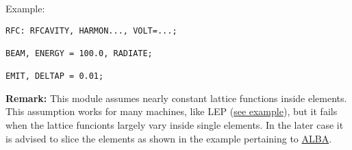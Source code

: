 Example: 
\begin{verbatim}
RFC: RFCAVITY, HARMON..., VOLT=...;
     
BEAM, ENERGY = 100.0, RADIATE;
     
EMIT, DELTAP = 0.01;
\end{verbatim}

{\bf Remark:}  This module assumes nearly constant lattice functions
inside elements. This assumption works for many machines, like LEP
(\href{http://cern.ch/frs/mad-X_examples/emit/LEP/}{see example}), but
it fails when the lattice funcionts largely vary inside single
elements. In the later case it is advised to slice the elements as shown
in the example pertaining to
\href{http://cern.ch/frs/mad-X_examples/emit/ALBA/}{ALBA}.     


